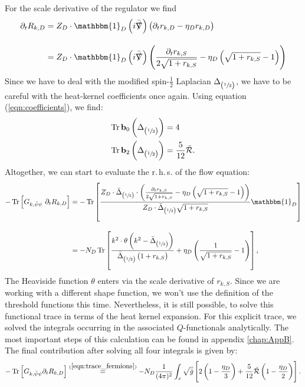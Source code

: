 For the scale derivative of the regulator we find
\begin{equation}
\begin{aligned}
	\partial_tR_{k,D} &=  
	Z_D\cdot\mathbbm{1}_D\left(i\bar{\slashed{\nabla}}\right)\left(\partial_t r_{k,D} - \eta_D r_{k,D}\right) \\[10pt]
	&=Z_D\cdot\mathbbm{1}_D\left(i\bar{\slashed{\nabla}}\right)\left(\frac{\partial_t r_{k,S}}{2\sqrt{1+r_{k, S}}} - \eta_D\left(\sqrt{1+r_{k,S}} -1\right)\right)
\end{aligned} 
\end{equation}
Since we have to deal with the modified spin-$\frac{1}{2}$ Laplacian $\Delta_{\left(\sfrac{1}{2}\right)}$, we have to be careful with the heat-kernel coefficients once again. Using equation (\ref{eqn:coefficients}), we find:
\begin{equation}
\begin{aligned}
	\operatorname{Tr}\mathbf{b}_0\left(\Delta_{\left(\sfrac{1}{2}\right)}\right) &= 4\\
	\operatorname{Tr}\mathbf{b}_2\left(\Delta_{\left(\sfrac{1}{2}\right)}\right) &= \frac{5}{12}\bar{\mathcal{R}}. \\
	\label{eqn:fermion_coefficients}
\end{aligned} 
\end{equation}
Altogether, we can start to evaluate the r.\,h.\,s. of the flow equation:
\begin{equation}
\begin{aligned}
	-\tr{G_{k, \bar{\psi}\psi}\ \partial_t R_{k,D}} &=-\tr{\frac{Z_D\cdot\bar{\Delta}_{\left(\sfrac{1}{2}\right)}\cdot\left(\frac{\partial_t r_{k,S}}{2\sqrt{1+r_{k, S}}} - \eta_D\left(\sqrt{1+r_{k,S}} -1\right)\right)}{Z_D\cdot\bar{\Delta}_{\left(\sfrac{1}{2}\right)}\sqrt{1 + r_{k,S}}}\mathbbm{1}_D} \\[10pt]
	&= -N_D\tr{\frac{k^2\cdot\theta\left(k^2-\bar{\Delta}_{\left(\sfrac{1}{2}\right)}\right)}{\bar{\Delta}_{\left(\sfrac{1}{2}\right)}\left(1+r_{k,S}\right)} + \eta_D\left(\frac{1}{\sqrt{1+r_{k,S}}}-1\right)},
	\end{aligned}
\end{equation}
The Heaviside function $\theta$ enters via the scale derivative of $r_{k,S}$. Since we are working with a different shape function, we won't use the definition of the threshold functions this time. Nevertheless, it is still possible, to solve this functional trace in terms of the heat kernel expansion. For this explicit trace, we solved the integrals occurring in the associated $Q$-functionals analytically. The most important steps of this calculation can be found in appendix \ref{chap:AppB}. The final contribution after solving all four integrals is given by:
\begin{equation}
	-\operatorname{Tr}\left[G_{k, \bar{\psi} \psi} \partial_{t} R_{k, D}\right]\overset{(\mathrm{\ref{eqn:trace_fermions}})}{=} -N_D\frac{1}{(4\pi)^2}\int_x\sqrt{\bar{g}}\left[2\left(1-\frac{\eta_D}{3}\right) + \frac{5}{12}\bar{\mathcal{R}}\left(1-\frac{\eta_D}{2}\right)\right].
\end{equation}
